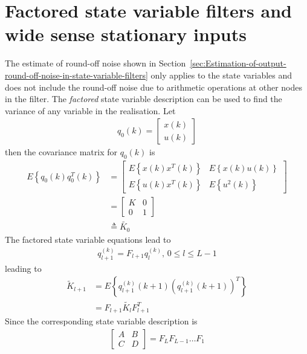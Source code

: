 \documentclass[a4paper,twoside,10pt,english]{report}
\begin{document}
\section{Factored state variable filters and wide sense stationary inputs}
The estimate of round-off noise shown in 
Section~\ref{sec:Estimation-of-output-round-off-noise-in-state-variable-filters}
only applies to the state variables and does not include the round-off noise due 
to arithmetic operations at other nodes in the filter. The \emph{factored} 
state variable description can be used to find the variance of any variable 
in the realisation. Let 
\begin{align*}
q_{0}\left(k\right) = \left[\begin{array}{c}
x\left(k\right)\\
u\left(k\right)
\end{array}\right]
\end{align*}
then the covariance matrix for $q_{0}\left(k\right)$ is 
\begin{align*}
E\left\{q_{0}\left(k\right)q_{0}^{T}\left(k\right)\right\} &= 
\left[\begin{array}{cc}
E\left\{x\left(k\right)x^{T}\left(k\right)\right\} & E\left\{x\left(k\right)u\left(k\right)\right\}\\
E\left\{u\left(k\right)x^{T}\left(k\right)\right\} & E\left\{u^{2}\left(k\right)\right\}
\end{array}\right]\\
 &= \left[\begin{array}{cc}
K & 0\\
0 & 1
\end{array}\right]\\
 & \triangleq{} \tilde{K_{0}}
\end{align*}
The factored state variable equations lead to
\begin{align*}
q_{l+1}^{\left(k\right)} = F_{l+1}q_{l}^{\left(k\right)},\,0\leq l\leq L-1
\end{align*}
leading to
\begin{align*}
\tilde{K}_{l+1} &= E\left\{q_{l+1}^{\left(k\right)}\left(k+1\right)
\left(q_{l+1}^{\left(k\right)}\left(k+1\right)\right)^{T}\right\}\\
 &= F_{l+1}\tilde{K_{l}}F_{l+1}^{T}
\end{align*}
Since the corresponding state variable description is
\begin{align*}
\left[\begin{array}{cc}
A & B\\
C & D
\end{array}\right] = F_{L}F_{L-1}\ldots F_{1}
\end{align*}
\end{document}

